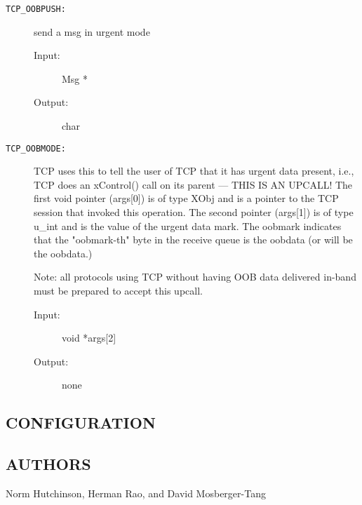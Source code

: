 \begin{description}
\item[{\tt TCP\_OOBPUSH:}]
send a msg in urgent mode
\begin{description}
\item[{\rm Input:}] Msg *
\item[{\rm Output:}] char
\end{description}



\item[{\tt TCP\_OOBMODE:}]
TCP uses this to tell the user of TCP that it has
urgent data present, i.e., TCP does an xControl() call on
its parent --- THIS IS AN UPCALL!
The first void pointer (args[0]) is of type XObj and is
a pointer to the TCP session that invoked this operation.
The second pointer (args[1]) is of type u\_int and is the
value of the urgent data mark. 
The oobmark indicates that the "oobmark-th" byte in the
receive queue is the oobdata (or will be the oobdata.)

Note: all protocols using TCP without having OOB data delivered
in-band must be prepared to accept this upcall.


\begin{description}
\item[{\rm Input:}] void *args[2]
\item[{\rm Output:}] none
\end{description}


\end{description}

\subsection*{CONFIGURATION}


\subsection*{AUTHORS}

Norm Hutchinson, Herman Rao, and David Mosberger-Tang

